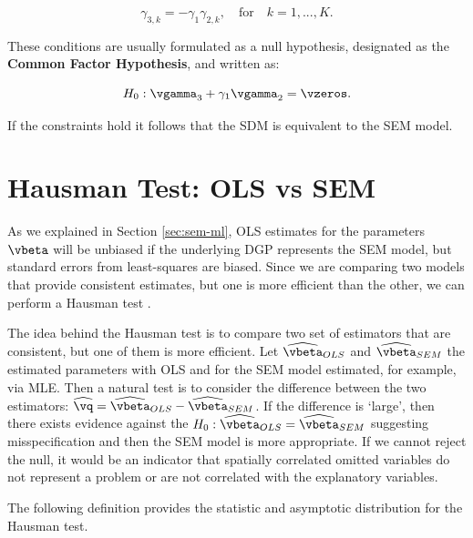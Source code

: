 \documentclass[english,12pt]{book}\usepackage[]{graphicx}\usepackage[]{xcolor}
\begin{document}
\begin{equation}
  \gamma_{3, k} = -\gamma_1\gamma_{2,k}, \quad \mbox{for}\quad k = 1,...,K.
\end{equation}

These conditions are usually formulated as a null hypothesis, designated as the \textbf{Common Factor Hypothesis}, and written as:

\begin{equation}
  H_0:\vgamma_3  + \gamma_1\vgamma_2 = \vzeros.
\end{equation}

If the constraints hold it follows that the SDM is equivalent to the SEM model. 

\section{Hausman Test: OLS vs SEM}

As we explained in Section \ref{sec:sem-ml}, OLS estimates for the parameters $\vbeta$ will be unbiased if the underlying DGP represents the SEM model, but standard errors from least-squares are biased. Since we are comparing two models that provide consistent estimates, but one is more efficient than the other, we can perform a Hausman test \citep{pace2008spatial}. 

The idea behind the Hausman test is to compare two set of estimators that are consistent, but one of them is more efficient. Let $\widehat{\vbeta}_{OLS}$ and $\widehat{\vbeta}_{SEM}$ the estimated parameters with OLS and for the SEM model estimated, for example, via MLE. Then a natural test is to consider the difference between the two estimators: $\widehat{\vq}=\widehat{\vbeta}_{OLS}-\widehat{\vbeta}_{SEM}$. If the difference is `large', then there exists evidence against the $H_0:\widehat{\vbeta}_{OLS}=\widehat{\vbeta}_{SEM}$ suggesting misspecification and then the SEM model is more appropriate. If we cannot reject the null, it would be an indicator that spatially correlated omitted variables do not represent a problem or are not correlated with the explanatory variables. 


The following definition provides the statistic and asymptotic distribution for the Hausman test. 
\end{document}
